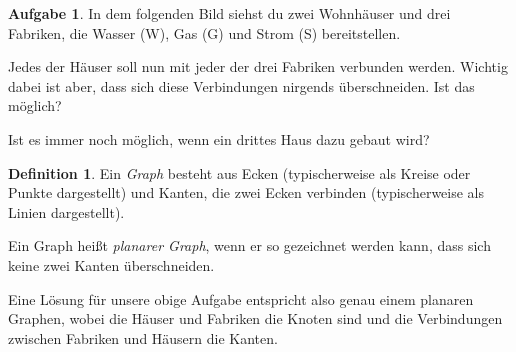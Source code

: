 \documentclass[a4paper,ngerman,12pt]{scrartcl}
\theoremstyle{definition}
\newtheorem{defn}{Definition}[]
\newtheorem{aufg}{Aufgabe}
\theoremstyle{plain}
\theoremstyle{remark}
\begin{document}
\begin{aufg}
	In dem folgenden Bild siehst du zwei Wohnhäuser und drei Fabriken, die Wasser (W), Gas (G) und Strom (S) bereitstellen. 
	\begin{center}
	\end{center}	
	Jedes der Häuser soll nun mit jeder der drei Fabriken verbunden werden. Wichtig dabei ist aber, dass sich diese Verbindungen nirgends überschneiden. Ist das möglich?
	
	Ist es immer noch möglich, wenn ein drittes Haus dazu gebaut wird?
\end{aufg}

\begin{defn}
	Ein \emph{Graph} besteht aus Ecken (typischerweise als Kreise oder Punkte dargestellt) und Kanten, die zwei Ecken verbinden (typischerweise als Linien dargestellt).
	
	Ein Graph heißt \emph{planarer Graph}, wenn er so gezeichnet werden kann, dass sich keine zwei Kanten überschneiden.
\end{defn}

Eine Lösung für unsere obige Aufgabe entspricht also genau einem planaren Graphen, wobei die Häuser und Fabriken die Knoten sind und die Verbindungen zwischen Fabriken und Häusern die Kanten.
\end{document}
